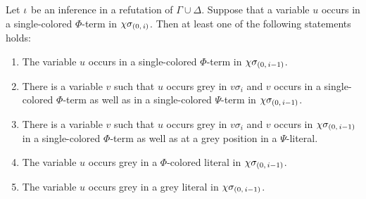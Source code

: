\documentclass[,%
	draft=false,%
	numbers=noendperiod
	12pt,
	a4paper,
	oneside,%
	openany,
]{memoir}
\begin{document}
\begin{clemma}
	Let $\iota$ be an inference in a refutation of $\Gamma\cup\Delta$.
	Suppose that a variable $u$ occurs in a single-colored $\Phi$-term in $\chi\sigma_{(0,\,i)}$.
	Then at least one of the following statements holds:
	\begin{enumerate}
		\item
			\label{15_1}
			The variable $u$ occurs in a single-colored $\Phi$-term in $\chi\sigma_{(0,\,i-1)}$.

		\item
			\label{15_2}
			There is a variable $v$ such that $u$ occurs grey in $v\sigma_i$ and $v$ occurs in a single-colored $\Phi$-term as well as in a single-colored $\Psi$-term in $\chi\sigma_{(0,\,i-1)}$.


		\item
			\label{15_4}
			There is a variable $v$ such that $u$ occurs grey in $v\sigma_i$ and $v$ occurs in $\chi\sigma_{(0,\,i-1)}$ in a single-colored $\Phi$-term as well as at a grey position in a $\Psi$-literal.

		\item
			\label{15_3}
			The variable $u$ occurs grey in a $\Phi$-colored literal in $\chi\sigma_{(0,\,i-1)}$.

		\item
			\label{15_5}
			The variable $u$ occurs grey in a grey literal in $\chi\sigma_{(0,\,i-1)}$.

	\end{enumerate}
\end{clemma}
\end{document}
